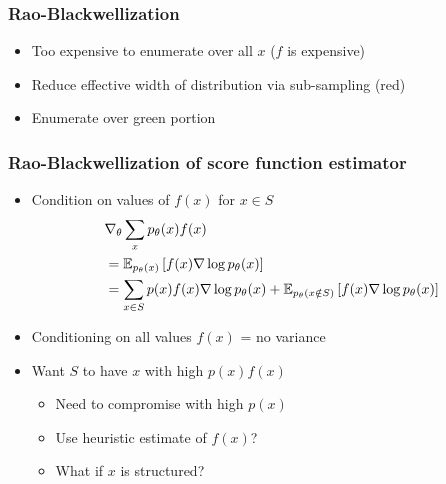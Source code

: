 \documentclass{beamer}
\begin{document}
\begin{frame}
\frametitle{Rao-Blackwellization}
\begin{itemize}
\item Too expensive to enumerate over all $x$ ($f$ is expensive)
\item Reduce effective width of distribution via sub-sampling (red)
\item Enumerate over green portion
\end{itemize}
\centering
{}
\end{frame}


\begin{frame}
\frametitle{Rao-Blackwellization of score function estimator}
\begin{itemize}
\item Condition on values of $f(x)$ for $x\in S$
    \begin{align*}
    &\nabla_\theta \sum_x p_\theta(x)f(x)\\
    &= \mathbb{E}_{p_\theta(x)}\left[f(x)\nabla \log p_\theta(x)\right]\\
    &= \sum_{x\in S} p(x)f(x)\nabla \log p_\theta(x)
    + \mathbb{E}_{p_\theta(x \notin S)}\left[f(x)\nabla \log p_\theta(x)\right]
    \end{align*}
\item Conditioning on all values $f(x)$ = no variance
\item Want $S$ to have $x$ with high $p(x)f(x)$
    \begin{itemize}
    \item Need to compromise with high $p(x)$
    \item Use heuristic estimate of $f(x)$?
    \item What if $x$ is structured?
    \end{itemize}
\end{itemize}
\end{frame}
\end{document}
